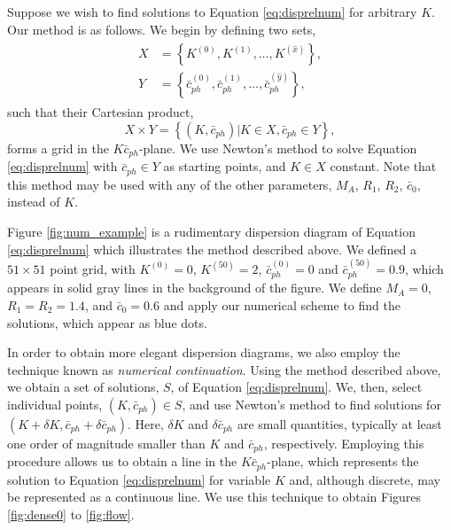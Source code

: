 Suppose we wish to find solutions to Equation \eqref{eq:disprelnum} for arbitrary $K$.
Our method is as follows.
We begin by defining two sets,
%
\begin{align}
\begin{split}
X & = \left\{ K^{(0)}, K^{(1)}, \dots, K^{(\hat x)} \right\},
\\
Y & = \left\{ \bar c_{ph}^{(0)}, \bar c_{ph}^{(1)}, \dots, \bar c_{ph}^{(\hat y)} \right\},
\end{split}
\end{align}
%
such that their Cartesian product,
%
\begin{equation}
X \times Y = \left\{ (K, \bar c_{ph}) | K \in X,  \bar c_{ph} \in Y \right\},
\end{equation}
%
forms a grid in the $K \bar c_{ph}$-plane.
We use Newton's method to solve Equation \eqref{eq:disprelnum} with $\bar c_{ph} \in Y$ as starting points, and $K \in X$ constant.
Note that this method may be used with any of the other parameters, $M_A$, $R_1$, $R_2$, $\bar c_0$, instead of $K$.

Figure \ref{fig:num_example} is a rudimentary dispersion diagram of Equation \eqref{eq:disprelnum} which illustrates the method described above.
We defined a $51 \times 51$ point grid, with $K^{(0)} = 0$, $K^{(50)} = 2$, $\bar c_{ph}^{(0)} = 0$ and $\bar c_{ph}^{(50)} = 0.9$, which appears in solid gray lines in the background of the figure.
We define $M_A=0$, $R_1=R_2=1.4$, and $\bar c_0 = 0.6$ and apply our numerical scheme to find the solutions, which appear as blue dots.

In order to obtain more elegant dispersion diagrams, we also employ the technique known as \emph{numerical continuation}.
Using the method described above, we obtain a set of solutions, $S$, of Equation \eqref{eq:disprelnum}.
We, then, select individual points, $(K, \bar c_{ph}) \in S$,  and use Newton's method to find solutions for $(K + \delta K, \bar c_{ph} + \delta \bar c_{ph})$.
Here, $\delta K$ and $\delta \bar c_{ph}$ are small quantities, typically at least one order of magnitude smaller than $K$ and $\bar c_{ph}$, respectively.
Employing this procedure allows us to obtain a line in the $K \bar c_{ph}$-plane, which represents the solution to Equation \eqref{eq:disprelnum} for variable $K$ and, although discrete, may be represented as a continuous line.
We use this technique to obtain Figures \ref{fig:dense0} to \ref{fig:flow}.



